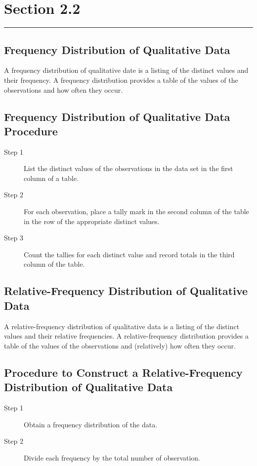 \documentclass[12pt]{article}
\begin{document}
    \section*{Section 2.2}
    \noindent\rule{\textwidth}{0.4pt}
        \subsection*{Frequency Distribution of Qualitative Data}
            A frequency distribution of qualitative date is a listing of the distinct
            values and their frequency. A frequency distribution provides a table of the
            values of the observations and how often they occur.
        \subsection*{Frequency Distribution of Qualitative Data Procedure}
            \begin{description}
                \item[Step 1] List the distinct values of the observations in the data set
                in the first column of a table.
                \item[Step 2] For each observation, place a tally mark in the second column
                of the table in the row of the appropriate distinct values.
                \item[Step 3] Count the tallies for each distinct value and record totals
                in the third column of the table.
            \end{description}
        \subsection*{Relative-Frequency Distribution of Qualitative Data}
            A relative-frequency distribution of qualitative data is a listing of the
            distinct values and their relative frequencies. A relative-frequency
            distribution provides a table of the values of the observations and (relatively)
            how often they occur.
        \subsection*{Procedure to Construct a Relative-Frequency Distribution of Qualitative
        Data}
            \begin{description}
                \item[Step 1] Obtain a frequency distribution of the data.
                \item[Step 2] Divide each frequency by the total number of observation. 
            \end{description}
\end{document}
